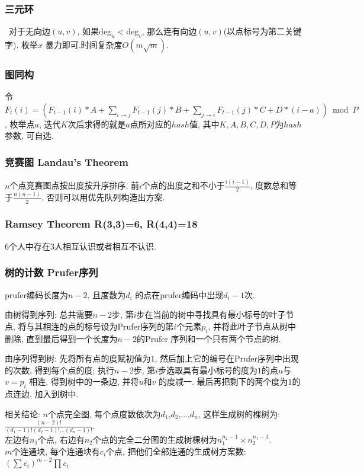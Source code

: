 \subsubsection{三元环}\
               对于无向边$(u,v)$, 如果$\mathrm{deg}_u<\mathrm{deg}_v$, 那么连有向边$(u,v)$(以点标号为第二关键字). 枚举$x$ 暴力即可.时间复杂度$O(m\sqrt{m})$. 
\subsubsection{图同构}
                令$F_t(i)=(F_{t-1}(i)*A+\sum_{i\to j} F_{t-1}(j)*B+\sum_{j\to i} F_{t-1}(j)*C+D*(i-a)) \bmod P$, 枚举点$a$, 迭代$K$次后求得的就是$a$点所对应的$hash$值, 其中$K,A,B,C,D,P$为$hash$参数, 可自选. 
\subsubsection{竞赛图 Landau's Theorem}
    $n$个点竞赛图点按出度按升序排序, 前$i$个点的出度之和不小于$\frac{i(i-1)}{2}$, 度数总和等于$\frac{n(n-1)}{2}$. 否则可以用优先队列构造出方案.

\subsubsection{Ramsey Theorem R(3,3)=6, R(4,4)=18}
    $6$个人中存在$3$人相互认识或者相互不认识.

\subsubsection{树的计数 Prufer序列}
    prufer编码长度为${n-2}$, 且度数为$d_i$ 的点在prufer编码中出现${d_i -1}$次. 
    \par 由树得到序列: 总共需要$n-2$步, 第$i$步在当前的树中寻找具有最小标号的叶子节点, 将与其相连的点的标号设为Prufer序列的第$i$个元素$p_i$, 并将此叶子节点从树中删除, 直到最后得到一个长度为$n-2$的Prufer 序列和一个只有两个节点的树. 
    \par 由序列得到树: 先将所有点的度赋初值为$1$, 然后加上它的编号在Prufer序列中出现的次数, 得到每个点的度; 执行$n-2$步, 第$i$步选取具有最小标号的度为$1$的点$u$与$v=p_i$ 相连, 得到树中的一条边, 并将$u$和$v$ 的度减一. 最后再把剩下的两个度为$1$的点连边, 加入到树中. 
    \par 相关结论: $n$个点完全图, 每个点度数依次为$d_1$,$d_2$,...,$d_n$, 这样生成树的棵树为: ${\frac{(n-2)!}{(d_1-1)!(d_2-1)!...(d_n-1)!}}$.\\
    左边有$n_1$个点, 右边有$n_2$个点的完全二分图的生成树棵树为$n_1^{n_2-1}\times n_2^{n_1-1}$. \\
    $m$个连通块, 每个连通块有$c_i$个点, 把他们全部连通的生成树方案数: $(\sum c_i)^{m-2}\prod c_i$
